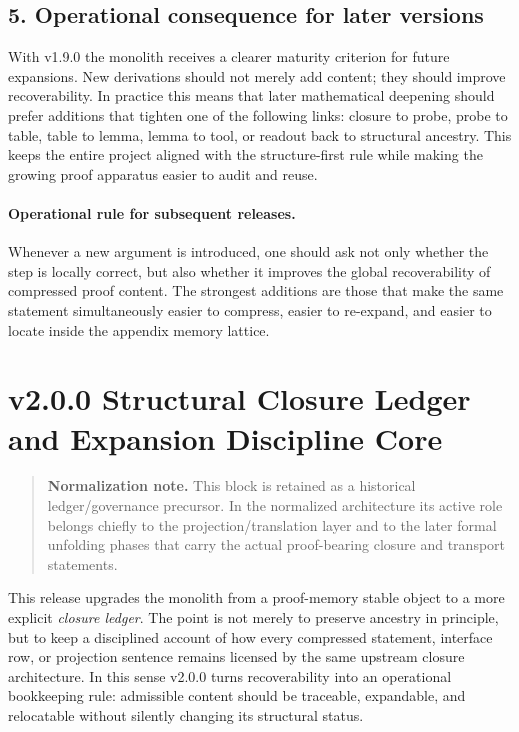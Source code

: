 \subsection*{5. Operational consequence for later versions}
With v1.9.0 the monolith receives a clearer maturity criterion for future
expansions. New derivations should not merely add content; they should improve
recoverability. In practice this means that later mathematical deepening should
prefer additions that tighten one of the following links: closure to probe,
probe to table, table to lemma, lemma to tool, or readout back to structural
ancestry. This keeps the entire project aligned with the structure-first rule
while making the growing proof apparatus easier to audit and reuse.

\paragraph{Operational rule for subsequent releases.}
Whenever a new argument is introduced, one should ask not only whether the step
is locally correct, but also whether it improves the global recoverability of
compressed proof content. The strongest additions are those that make the same
statement simultaneously easier to compress, easier to re-expand, and easier to
locate inside the appendix memory lattice.



\section*{v2.0.0 Structural Closure Ledger and Expansion Discipline Core}
\begin{quote}
\textbf{Normalization note.} This block is retained as a historical ledger/governance precursor. In the normalized architecture its active role belongs chiefly to the projection/translation layer and to the later formal unfolding phases that carry the actual proof-bearing closure and transport statements.
\end{quote}

This release upgrades the monolith from a proof-memory stable object to a more
explicit \emph{closure ledger}. The point is not merely to preserve ancestry in
principle, but to keep a disciplined account of how every compressed statement,
interface row, or projection sentence remains licensed by the same upstream
closure architecture. In this sense v2.0.0 turns recoverability into an
operational bookkeeping rule: admissible content should be traceable, expandable,
and relocatable without silently changing its structural status.

